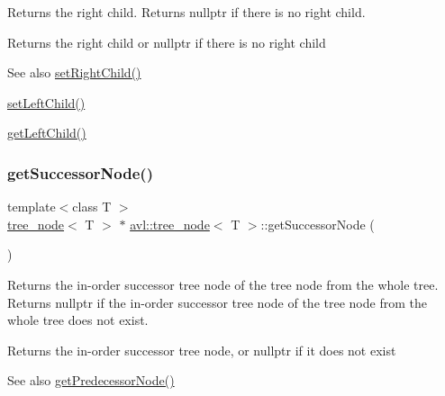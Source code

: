 Returns the right child. Returns nullptr if there is no right child. \begin{DoxyReturn}{Returns}
the right child or nullptr if there is no right child 
\end{DoxyReturn}
\begin{DoxySeeAlso}{See also}
\hyperlink{classavl_1_1tree__node_a8b36f21d28a09858e32ba9f1b349994f}{set\+Right\+Child()} 

\hyperlink{classavl_1_1tree__node_acb0fbbc7cca1f2b18e72fb728be23979}{set\+Left\+Child()} 

\hyperlink{classavl_1_1tree__node_ad12a5f6a41cfc6203913c5b6bce30837}{get\+Left\+Child()} 
\end{DoxySeeAlso}
\mbox{\label{classavl_1_1tree__node_aa25a278d7fe3d4d83846bbf7fc256116}} 
\subsubsection{\texorpdfstring{get\+Successor\+Node()}{getSuccessorNode()}}
{\footnotesize\ttfamily template$<$class T $>$ \\
\hyperlink{classavl_1_1tree__node}{tree\+\_\+node}$<$ T $>$ $\ast$ \hyperlink{classavl_1_1tree__node}{avl\+::tree\+\_\+node}$<$ T $>$\+::get\+Successor\+Node (\begin{DoxyParamCaption}{ }\end{DoxyParamCaption})}

Returns the in-\/order successor tree node of the tree node from the whole tree. Returns nullptr if the in-\/order successor tree node of the tree node from the whole tree does not exist. \begin{DoxyReturn}{Returns}
the in-\/order successor tree node, or nullptr if it does not exist 
\end{DoxyReturn}
\begin{DoxySeeAlso}{See also}
\hyperlink{classavl_1_1tree__node_af865187e8d61080dd1720a28195a0c1f}{get\+Predecessor\+Node()} 
\end{DoxySeeAlso}
\mbox{\label{classavl_1_1tree__node_a3aabce32e81215733da2f6fff33a4809}} 
